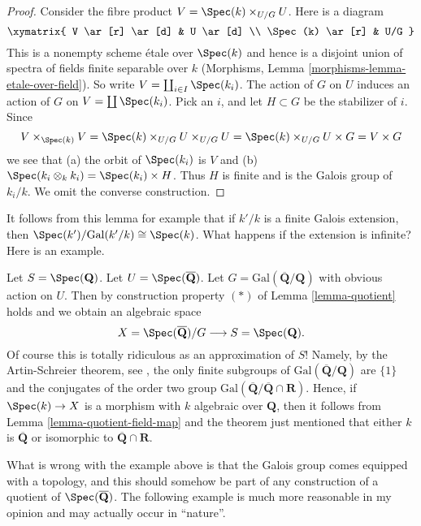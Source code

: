 \begin{proof}
Consider the fibre product $V = \Spec(k) \times_{U/G} U$.
Here is a diagram
$$
\xymatrix{
V \ar[r] \ar[d] & U \ar[d] \\
\Spec(k) \ar[r] & U/G
}
$$
This is a nonempty scheme \'etale over $\Spec(k)$ and hence is a
disjoint union of spectra of fields finite separable over $k$
(Morphisms, Lemma \ref{morphisms-lemma-etale-over-field}). So write
$V = \coprod_{i \in I} \Spec(k_i)$.
The action of $G$ on $U$ induces an action of $G$ on
$V = \coprod \Spec(k_i)$. Pick an $i$, and let $H \subset G$ be
the stabilizer of $i$. Since
$$
V \times_{\Spec(k)} V =
\Spec(k) \times_{U/G} U \times_{U/G} U =
\Spec(k) \times_{U/G} U \times G =
V \times G
$$
we see that (a) the orbit of $\Spec(k_i)$ is $V$ and
(b) $\Spec(k_i \otimes_k k_i) = \Spec(k_i) \times H$.
Thus $H$ is finite and is the Galois group of $k_i/k$.
We omit the converse construction.
\end{proof}

\noindent
It follows from this lemma for example that
if $k'/k$ is a finite Galois extension, then
$\Spec(k')/\text{Gal}(k'/k) \cong \Spec(k)$.
What happens if the extension is infinite? Here is an example.

\begin{example}
\label{example-Qbar}
Let $S = \Spec(\mathbf{Q})$.
Let $U = \Spec(\overline{\mathbf{Q}})$.
Let $G = \text{Gal}(\overline{\mathbf{Q}}/\mathbf{Q})$ with obvious
action on $U$. Then by construction property $(*)$ of
Lemma \ref{lemma-quotient} holds and we obtain an algebraic space
$$
X = \Spec(\overline{\mathbf{Q}})/G
\longrightarrow
S = \Spec(\mathbf{Q}).
$$
Of course this is totally ridiculous as an approximation of $S$!
Namely, by the Artin-Schreier theorem,
see \cite[Theorem 17, page 316]{JacobsonIII},
the only finite subgroups of $\text{Gal}(\overline{\mathbf{Q}}/\mathbf{Q})$
are $\{1\}$ and the conjugates of the order two group
$\text{Gal}(\overline{\mathbf{Q}}/\overline{\mathbf{Q}} \cap \mathbf{R})$.
Hence, if
$\Spec(k) \to X$ is a morphism with $k$ algebraic over $\mathbf{Q}$,
then it follows from Lemma \ref{lemma-quotient-field-map} and the theorem
just mentioned that either $k$ is $\overline{\mathbf{Q}}$ or isomorphic to
$\overline{\mathbf{Q}} \cap \mathbf{R}$.
\end{example}

\noindent
What is wrong with the example above is that
the Galois group comes equipped with a topology,
and this should somehow be part of any construction
of a quotient of $\Spec(\overline{\mathbf{Q}})$.
The following example is much more reasonable in my opinion
and may actually occur in ``nature''.

